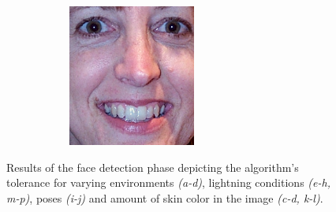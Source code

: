 \begin{figure}[H]
\begin{subfigure}{0.65\textwidth}
\begin{subfigure}{.33\textwidth}
  \caption{}
\end{subfigure}%
\begin{subfigure}{.33\textwidth}
  \centering
  \includegraphics[width=0.6\textwidth]{img/fdResult1/output76.png}
  \caption{}
\end{subfigure}%
\end{subfigure}%

\caption{Results of the face detection phase depicting the algorithm's tolerance for varying environments \textit{(a-d)}, lightning conditions \textit{(e-h, m-p)}, poses \textit{(i-j)} and amount of skin color in the image \textit{(c-d, k-l)}.}


\label{fig:fdResults}
\end{figure}